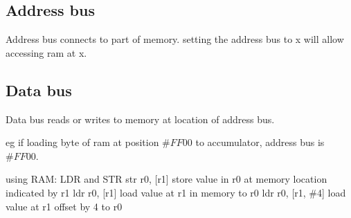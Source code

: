 
\subsection{Address bus}

Address bus connects to part of memory. setting the address bus to x will allow accessing ram at x.

\subsection{Data bus}

Data bus reads or writes to memory at location of address bus.

eg if loading byte of ram at position \(\#FF00\) to accumulator, address bus is \(\#FF00\).


using RAM: LDR and STR
str r0, [r1]
store value in r0 at memory location indicated by r1
ldr r0, [r1]
load value at r1 in memory to r0
ldr r0, [r1, \#4]
load value at r1 offset by 4 to r0


